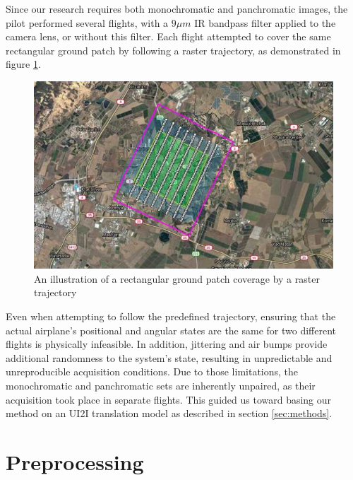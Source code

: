 Since our research requires both monochromatic and panchromatic images, the pilot performed several flights, with a $9 \mu m$ IR bandpass filter applied to the camera lens, or without this filter.
Each flight attempted to cover the same rectangular ground patch by following a raster trajectory, as demonstrated in figure \ref{fig:aerial_strip}.
\begin{figure}[H]
    \centering
    \includegraphics[width=\linewidth]{../figs/data/aerial_strip.jpeg}
    \caption{An illustration of a rectangular ground patch coverage by a raster trajectory}
    \label{fig:aerial_strip}
\end{figure}
Even when attempting to follow the predefined trajectory, ensuring that the actual airplane's positional and angular states are the same for two different flights is physically infeasible.
In addition, jittering and air bumps provide additional randomness to the system's state, resulting in unpredictable and unreproducible acquisition conditions.
Due to those limitations, the monochromatic and panchromatic sets are inherently unpaired, as their acquisition took place in separate flights.
This guided us toward basing our method on an UI2I translation model as described in section \ref{sec:methods}.

\section{Preprocessing}

